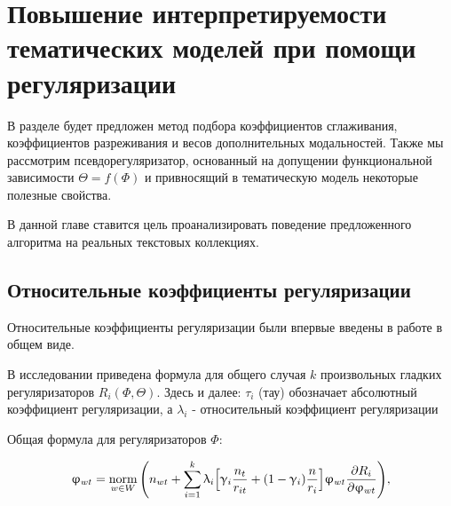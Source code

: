 \chapter{Повышение интерпретируемости тематических моделей при помощи регуляризации} 

В разделе будет предложен метод подбора коэффициентов сглаживания, коэффициентов разреживания и весов дополнительных модальностей. Также мы рассмотрим псевдорегуляризатор, основанный на допущении функциональной зависимости $\Theta = f(\Phi)$ и привносящий в тематическую модель некоторые полезные свойства.  

В данной главе ставится цель проанализировать поведение предложенного алгоритма на реальных текстовых коллекциях.  

\section{Относительные коэффициенты регуляризации} 



Относительные коэффициенты регуляризации были впервые введены в работе \cite{doykov} в общем виде.  


В исследовании \cite{doykov} приведена формула для общего случая $k$ произвольных гладких регуляризаторов $R_i(\Phi, \Theta)$. Здесь и далее: $\tau_i$ (тау) обозначает абсолютный коэффициент регуляризации, а $\lambda_i$ - относительный коэффициент регуляризации 

Общая формула для регуляризаторов $\Phi$: 

\[ 
\upvarphi_{wt} = \mathop{\mathrm{norm}}\limits_{w \in W}\Bigg(  
    n_{wt} + \sum_{i=1}^k \uplambda_i \Big[ 
        \upgamma_i \frac{n_t}{r_{it}} + (1-\upgamma_i)\frac{n}{r_i} 
        \Big]  
    \upvarphi_{wt} \frac{\partial R_i}{\partial \upvarphi_{wt}} 
\Bigg), \label{rel_phi_general} 
\] 

